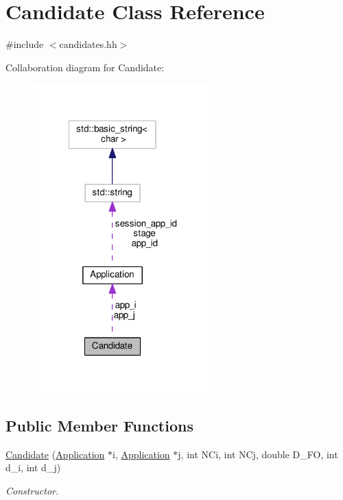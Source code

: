 \hypertarget{classCandidate}{\section{Candidate Class Reference}
\label{classCandidate}
}


{\ttfamily \#include $<$candidates.\-hh$>$}



Collaboration diagram for Candidate\-:\nopagebreak
\begin{figure}[H]
\begin{center}
\leavevmode
\includegraphics[width=198pt]{classCandidate__coll__graph}
\end{center}
\end{figure}
\subsection*{Public Member Functions}
\begin{DoxyCompactItemize}
\item 
\hyperlink{classCandidate_a2d1453a6b8c1a39561e67a2c67b79ed1}{Candidate} (\hyperlink{classApplication}{Application} $\ast$i, \hyperlink{classApplication}{Application} $\ast$j, int N\-Ci, int N\-Cj, double D\-\_\-\-F\-O, int d\-\_\-i, int d\-\_\-j)
\begin{DoxyCompactList}\small\item\em Constructor. \end{DoxyCompactList}\end{DoxyCompactItemize}
